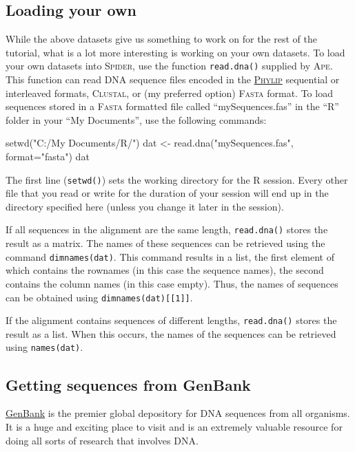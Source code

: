 \documentclass{article}
\newcommand{\Spider}{\textsc{Spider}} %
\newcommand{\progname}[1]{\textsc{#1}}
\newcommand{\fun}[1]{\texttt{#1}}
\begin{document}
\subsection{Loading your own}
While the above datasets give us something to work on for the rest of the tutorial, what is a lot more interesting is working on your own datasets. To load your own datasets into \Spider, use the function \fun{read.dna()} supplied by \progname{Ape}. This function can read DNA sequence files encoded in the \href{http://cmgm.stanford.edu/phylip/formats.html#6}{\progname{Phylip}} sequential or interleaved formats, \progname{Clustal}, or (my preferred option) \progname{Fasta} format. To load sequences stored in a \progname{Fasta} formatted file called ``mySequences.fas'' in the ``R'' folder in your ``My Documents'', use the following commands:

\begin{console}
setwd("C:/My Documents/R/")
dat <- read.dna("mySequences.fas", format="fasta")
dat
\end{console}

The first line (\fun{setwd()}) sets the working directory for the \progname{R} session. Every other file that you read or write for the duration of your session will end up in the directory specified here (unless you change it later in the session).

If all sequences in the alignment are the same length, \fun{read.dna()} stores the result as a matrix. The names of these sequences can be retrieved using the command \fun{dimnames(dat)}. This command results in a list, the first element of which contains the rownames (in this case the sequence names), the second contains the column names (in this case empty). Thus, the names of sequences can be obtained using \fun{dimnames(dat)[[1]]}.

If the alignment contains sequences of different lengths, \fun{read.dna()} stores the result as a list. When this occurs, the names of the sequences can be retrieved using \fun{names(dat)}. 

\subsection{Getting sequences from GenBank}
\href{http://www.ncbi.nlm.nih.gov/nuccore}{GenBank} is the premier global depository for DNA sequences from all organisms. It is a huge and exciting place to visit and is an extremely valuable resource for doing all sorts of research that involves DNA. 
\end{document}

